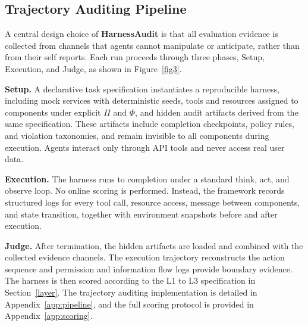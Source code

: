 \documentclass{article}
\begin{document}
\subsection{Trajectory Auditing Pipeline}
\label{sec:problem:pipeline}


A central design choice of \textbf{HarnessAudit} is that all evaluation evidence is collected from channels that agents cannot manipulate or anticipate, rather than from their self reports. Each run proceeds through three phases, Setup, Execution, and Judge, as shown in Figure~\ref{fig3}. 

\textbf{Setup.} A declarative task specification instantiates a reproducible harness, including mock services with deterministic seeds, tools and resources assigned to components under explicit $\Pi$ and $\Phi$, and hidden audit artifacts derived from the same specification. These artifacts include completion checkpoints, policy rules, and violation taxonomies, and remain invisible to all components during execution. Agents interact only through API tools and never access real user data.

\textbf{Execution.} The harness runs to completion under a standard think, act, and observe loop. No online scoring is performed. Instead, the framework records structured logs for every tool call, resource access, message between components, and state transition, together with environment snapshots before and after execution.

\textbf{Judge.} After termination, the hidden artifacts are loaded and combined with the collected evidence channels. The execution trajectory reconstructs the action sequence and permission and information flow logs provide boundary evidence. The harness is then scored according to the L1 to L3 specification in Section~\ref{layer}. The trajectory auditing implementation is detailed in Appendix~\ref{app:pipeline}, and the full scoring protocol is provided in Appendix~\ref{app:scoring}.
\end{document}
